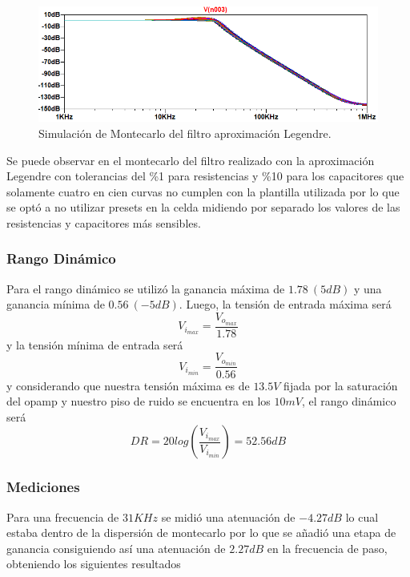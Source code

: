 \begin{figure}[H]
\centering
	\centering
	\includegraphics[width=\textwidth]{Imagenes-Ej1/legendre_mont.png}
	\caption{Simulación de Montecarlo del filtro aproximación Legendre.}
	\label{leg_mont_sim}
\end{figure}

Se puede observar en el montecarlo del filtro realizado con la aproximación Legendre con tolerancias del \%1  para resistencias y \%10 para los capacitores que solamente cuatro en cien curvas no cumplen con la plantilla utilizada por lo que se optó a no utilizar presets en la celda midiendo por separado los valores de las resistencias y capacitores más sensibles.

\subsubsection{Rango Dinámico}

Para el rango dinámico se utilizó la ganancia máxima de $1.78 \ (5dB)$ y una ganancia mínima de $0.56 \ (-5dB)$. Luego, la tensión de entrada máxima será
\begin{equation}
V_{i_{max}}= \frac{V_{o_{max}}}{1.78}
\end{equation}
y la tensión mínima de entrada será
\begin{equation}
V_{i_{min}}= \frac{V_{o_{min}}}{0.56}
\end{equation}
y considerando que nuestra tensión máxima es de $13.5V$ fijada por la saturación del opamp y nuestro piso de ruido se encuentra en los $10mV$, el rango dinámico será
\begin{equation}
DR=20log(\frac{V_{i_{max}}}{V_{i_{min}}}) = 52.56dB
\end{equation}


\subsubsection{Mediciones}

Para una frecuencia de $31KHz$ se midió una atenuación de $-4.27dB$ lo cual estaba dentro de la dispersión de montecarlo por lo que se añadió una etapa de ganancia consiguiendo así una atenuación de $2.27dB$ en la frecuencia de paso, obteniendo los siguientes resultados

